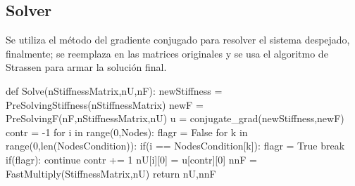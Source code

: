 \documentclass[12pt,a3paper]{article}
\begin{document}
\subsection{Solver}
Se utiliza el método del gradiente conjugado para resolver el sistema despejado, finalmente; se reemplaza en las matrices originales y se usa el algoritmo de Strassen para armar la solución final.
\begin{pyglist}[language=python,caption={Solver},style=pastie]
def Solve(nStiffnessMatrix,nU,nF):
    newStiffness = PreSolvingStiffness(nStiffnessMatrix)
    newF = PreSolvingF(nF,nStiffnessMatrix,nU)
    u = conjugate_grad(newStiffness,newF)    
    contr = -1
    for i in range(0,Nodes):
        flagr = False
        for k in range(0,len(NodesCondition)):
            if(i == NodesCondition[k]):
                flagr = True
                break
        if(flagr):
            continue
        contr += 1
        nU[i][0] = u[contr][0]
    nnF = FastMultiply(StiffnessMatrix,nU)
    return nU,nnF
\end{pyglist}
\end{document}
